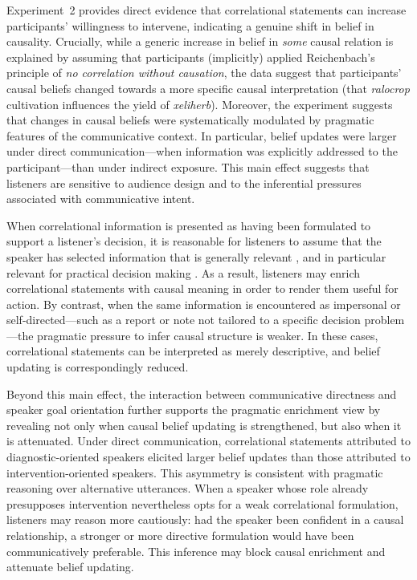 \documentclass[10pt,letterpaper]{article}
\begin{document}
Experiment~2 provides direct evidence that correlational statements can increase participants’ willingness to intervene, indicating a genuine shift in belief in causality. Crucially, while a generic increase in belief in \textit{some} causal relation is explained by assuming that participants (implicitly) applied Reichenbach's principle of \textit{no correlation without causation}, the data suggest that participants' causal beliefs changed towards a more specific causal interpretation (that \textit{ralocrop} cultivation influences the yield of \textit{xeliherb}).
Moreover, the experiment suggests that changes in causal beliefs were systematically modulated by pragmatic features of the communicative context. 
In particular, belief updates were larger under direct communication—when information was explicitly addressed to the participant—than under indirect exposure. This main effect suggests that listeners are sensitive to audience design and to the inferential pressures associated with communicative intent.

When correlational information is presented as having been formulated to support a listener’s decision, it is reasonable for listeners to assume that the speaker has selected information that is generally relevant \citep{SperberWilson1995}, and in particular relevant for practical decision making \citep{BenzvanRooijOptimalAssertions2007}. 
As a result, listeners may enrich correlational statements with causal meaning in order to render them useful for action. By contrast, when the same information is encountered as impersonal or self-directed—such as a report or note not tailored to a specific decision problem—the pragmatic pressure to infer causal structure is weaker. In these cases, correlational statements can be interpreted as merely descriptive, and belief updating is correspondingly reduced.

Beyond this main effect, the interaction between communicative directness and speaker goal orientation further supports the pragmatic enrichment view by revealing not only when causal belief updating is strengthened, but also when it is attenuated.
Under direct communication, correlational statements attributed to diagnostic-oriented speakers elicited larger belief updates than those attributed to intervention-oriented speakers. This asymmetry is consistent with pragmatic reasoning over alternative utterances. When a speaker whose role already presupposes intervention nevertheless opts for a weak correlational formulation, listeners may reason more cautiously: had the speaker been confident in a causal relationship, a stronger or more directive formulation would have been communicatively preferable. This inference may block causal enrichment and attenuate belief updating.
\end{document}
